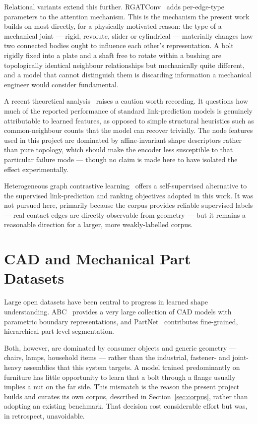 \documentclass[12pt,oneside,a4paper]{report}
\begin{document}
Relational variants extend this further. RGATConv~\cite{busbridge2019rgat}
adds per-edge-type parameters to the attention mechanism. This is the
mechanism the present work builds on most directly, for a physically
motivated reason: the type of a mechanical joint --- rigid, revolute, slider
or cylindrical --- materially changes how two connected bodies ought to
influence each other's representation. A bolt rigidly fixed into a plate and
a shaft free to rotate within a bushing are topologically identical
neighbour relationships but mechanically quite different, and a model that
cannot distinguish them is discarding information a mechanical engineer
would consider fundamental.

A recent theoretical analysis~\cite{linkheuristics2024} raises a caution
worth recording. It questions how much of the reported performance of
standard link-prediction models is genuinely attributable to learned
features, as opposed to simple structural heuristics such as common-neighbour
counts that the model can recover trivially. The node features used in this
project are dominated by affine-invariant shape descriptors rather than pure
topology, which should make the encoder less susceptible to that particular
failure mode --- though no claim is made here to have isolated the effect
experimentally.

Heterogeneous graph contrastive learning~\cite{heterognn2023} offers a
self-supervised alternative to the supervised link-prediction and ranking
objectives adopted in this work. It was not pursued here, primarily because
the corpus provides reliable supervised labels --- real contact edges are
directly observable from geometry --- but it remains a reasonable direction
for a larger, more weakly-labelled corpus.

\section{CAD and Mechanical Part Datasets}

Large open datasets have been central to progress in learned shape
understanding. ABC~\cite{koch2019abc} provides a very large collection of CAD
models with parametric boundary representations, and
PartNet~\cite{mo2019partnet} contributes fine-grained, hierarchical
part-level segmentation.

Both, however, are dominated by consumer objects and generic geometry ---
chairs, lamps, household items --- rather than the industrial, fastener- and
joint-heavy assemblies that this system targets. A model trained
predominantly on furniture has little opportunity to learn that a bolt
through a flange usually implies a nut on the far side. This mismatch is the
reason the present project builds and curates its own corpus, described in
Section~\ref{sec:corpus}, rather than adopting an existing benchmark. That
decision cost considerable effort but was, in retrospect, unavoidable.
\end{document}
